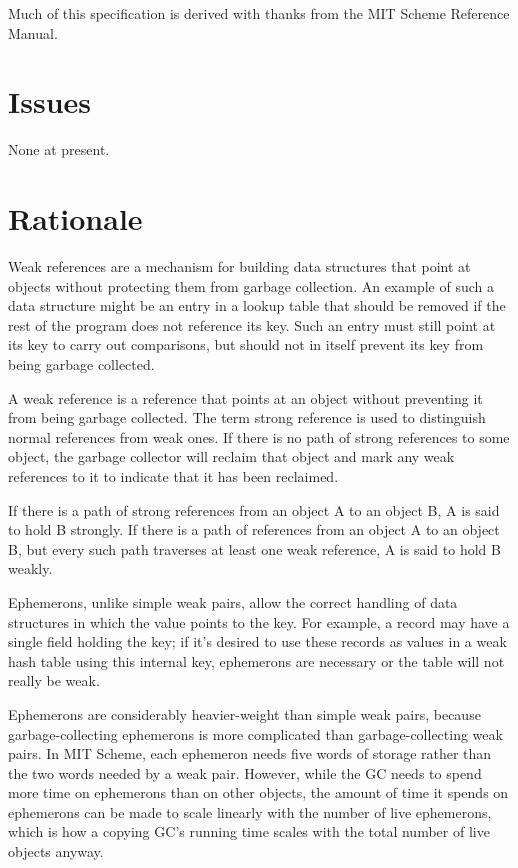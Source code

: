 Much of this specification is derived with thanks from the MIT Scheme
Reference Manual.

\section{Issues}\label{issues}

None at present.

\section{Rationale}\label{rationale}

Weak references are a mechanism for building data structures that point
at objects without protecting them from garbage collection. An example
of such a data structure might be an entry in a lookup table that should
be removed if the rest of the program does not reference its key. Such
an entry must still point at its key to carry out comparisons, but
should not in itself prevent its key from being garbage collected.

A weak reference is a reference that points at an object without
preventing it from being garbage collected. The term strong reference is
used to distinguish normal references from weak ones. If there is no
path of strong references to some object, the garbage collector will
reclaim that object and mark any weak references to it to indicate that
it has been reclaimed.

If there is a path of strong references from an object A to an object B,
A is said to hold B strongly. If there is a path of references from an
object A to an object B, but every such path traverses at least one weak
reference, A is said to hold B weakly.

Ephemerons, unlike simple weak pairs, allow the correct handling of data
structures in which the value points to the key. For example, a record
may have a single field holding the key; if it's desired to use these
records as values in a weak hash table using this internal key,
ephemerons are necessary or the table will not really be weak.

Ephemerons are considerably heavier-weight than simple weak pairs,
because garbage-collecting ephemerons is more complicated than
garbage-collecting weak pairs. In MIT Scheme, each ephemeron needs five
words of storage rather than the two words needed by a weak pair.
However, while the GC needs to spend more time on ephemerons than on
other objects, the amount of time it spends on ephemerons can be made to
scale linearly with the number of live ephemerons, which is how a
copying GC's running time scales with the total number of live objects
anyway.

